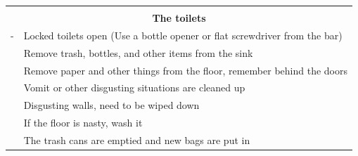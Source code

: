 \documentclass[a4paper,10pt,oneside,article]{memoir}
\begin{document}
\newpage
\vspace{0.5cm}
\noindent
\begin{tabular}{|l|l|}
    \hline
    \multicolumn{2}{|c|}{} \\
    \multicolumn{2}{|c|}{\Large \textbf{The toilets}} \\
    \hline
    \begin{minipage}[t]{0.15\textwidth}
        {\color{white}-}
    \end{minipage} & 
    \begin{minipage}[t]{0.80\textwidth}
        Locked toilets open (Use a bottle opener or flat screwdriver from the bar)
    \end{minipage} \\
    \hline
    \begin{minipage}[t]{0.15\textwidth}
    \end{minipage} & 
    \begin{minipage}[t]{0.80\textwidth}
        Remove trash, bottles, and other items from the sink
    \end{minipage} \\
    \hline
    \begin{minipage}[t]{0.15\textwidth}
    \end{minipage} & 
    \begin{minipage}[t]{0.80\textwidth}
        Remove paper and other things from the floor, remember behind the doors
    \end{minipage} \\
    \hline
    \begin{minipage}[t]{0.15\textwidth}
    \end{minipage} & 
    \begin{minipage}[t]{0.80\textwidth}
        Vomit or other disgusting situations are cleaned up
    \end{minipage} \\
    \hline
    \begin{minipage}[t]{0.15\textwidth}
    \end{minipage} & 
    \begin{minipage}[t]{0.80\textwidth}
        Disgusting walls, need to be wiped down
    \end{minipage} \\
    \hline
    \begin{minipage}[t]{0.15\textwidth}
    \end{minipage} & 
    \begin{minipage}[t]{0.80\textwidth}
        If the floor is nasty, wash it
    \end{minipage} \\
    \hline
    \begin{minipage}[t]{0.15\textwidth}
    \end{minipage} & 
    \begin{minipage}[t]{0.80\textwidth}
        The trash cans are emptied and new bags are put in
    \end{minipage} \\
    \hline
\end{tabular}
\end{document}

